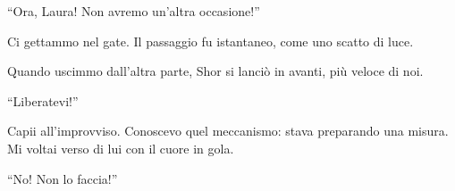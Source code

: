 \begin{center} \begin{minipage}{0.7\textwidth} \centering {} %
\end{minipage} \end{center}

\begin{dialogue}  \enquote{Ora, Laura! Non avremo un’altra occasione!} \end{dialogue}

Ci gettammo nel gate. Il passaggio fu istantaneo, come uno scatto di luce.

Quando uscimmo dall’altra parte, Shor si lanciò in avanti, più veloce di noi.

\begin{dialogue}  \enquote{Liberatevi!} \end{dialogue}

Capii all'improvviso. Conoscevo quel meccanismo: stava preparando una misura. Mi voltai verso di lui con il cuore in gola.

\begin{dialogue}  \enquote{No! Non lo faccia!} \end{dialogue}

